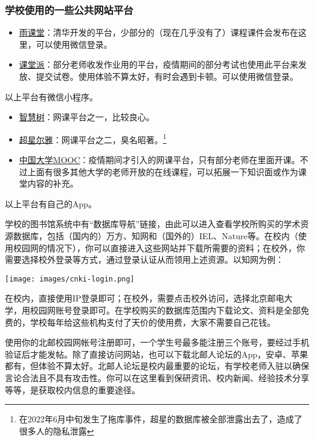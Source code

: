 \subsubsection*{学校使用的一些公共网站平台}
\begin{itemize}
    \item \href{https://www.yuketang.cn/web}{雨课堂}：清华开发的平台，少部分的（现在几乎没有了）课程课件会发布在这里，可以使用微信登录。
    \item \href{https://www.ketangpai.com/}{课堂派}：部分老师收发作业用的平台，疫情期间的部分考试也使用此平台来发放、提交试卷。使用体验不算太好，有时会遇到卡顿。可以使用微信登录。
\end{itemize}
以上平台有微信小程序。
\begin{itemize}
    \item \href{https://passport.zhihuishu.com/}{智慧树}：网课平台之一，比较良心。
    \item \href{http://erya.mooc.chaoxing.com/}{超星尔雅}：网课平台之二，臭名昭著。\footnote{在2022年6月中旬发生了拖库事件，超星的数据库被全部泄露出去了，造成了很多人的隐私泄露}
    \item \href{https://www.icourse163.org/learn}{中国大学MOOC}：疫情期间才引入的网课平台，只有部分老师在里面开课。不过上面有很多其他大学的老师开放的在线课程，可以拓展一下知识面或作为课堂内容的补充。
\end{itemize}
以上平台有自己的App。



学校的图书馆系统中有“数据库导航”链接，由此可以进入查看学校所购买的学术资源数据库，包括（国内的）万方、知网和（国外的）IEL、Nature等。在校内（使用校园网的情况下），你可以直接进入这些网站并下载所需要的资料；在校外，你需要选择校外登录等方式，通过登录认证从而领用上述资源。以知网为例：

\begin{center}
    \texttt{[image: images/cnki-login.png]}
\end{center}

在校内，直接使用IP登录即可；在校外，需要点击校外访问，选择北京邮电大学，用校园网账号登录即可。在学校购买的数据库范围内下载论文、资料是全部免费的，学校每年给这些机构支付了天价的使用费，大家不需要自己花钱。


使用你的北邮校园网帐号注册即可，一个学生号最多能注册三个账号，要经过手机验证后才能发帖。除了直接访问网站，也可以下载北邮人论坛的App，安卓、苹果都有，但体验不算太好。北邮人论坛是校内最重要的论坛，有学校老师入驻以确保言论合法且不具有攻击性。你可以在这里看到保研资讯、校内新闻、经验技术分享等等，是获取校内信息的重要途径。

